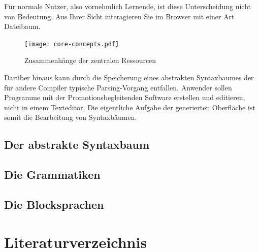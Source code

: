 \documentclass[paper=a4,fontsize=12pt,parskip=half]{scrartcl}
\begin{document}
Für normale Nutzer, also vornehmlich Lernende, ist diese Unterscheidung nicht von Bedeutung. Aus Ihrer Sicht interagieren Sie im Browser mit einer Art Dateibaum.

\begin{figure}
  \texttt{[image: core-concepts.pdf]}
  \caption{Zusammenhänge der zentralen Ressourcen}
  \label{fig:core-relations}
\end{figure}


Darüber hinaus kann durch die Speicherung eines abstrakten Syntaxbaumes der für andere Compiler typische Parsing-Vorgang entfallen. Anwender sollen Programme mit der Promotionsbegleitenden Software erstellen und editieren, nicht in einem Texteditor. Die eigentliche Aufgabe der generierten Oberfläche ist somit die Bearbeitung von Syntaxbäumen.

\subsection{Der abstrakte Syntaxbaum}

\subsection{Die Grammatiken}

\subsection{Die Blocksprachen}

\section{Literaturverzeichnis}
\printbibliography[heading=none]
\end{document}

